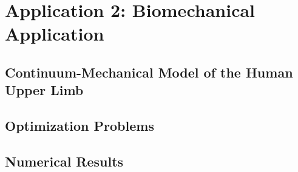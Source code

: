 
\chapter{Application 2: Biomechanical Application}


\section{Continuum-Mechanical Model of the Human Upper Limb}


\section{Optimization Problems}


\section{Numerical Results}

